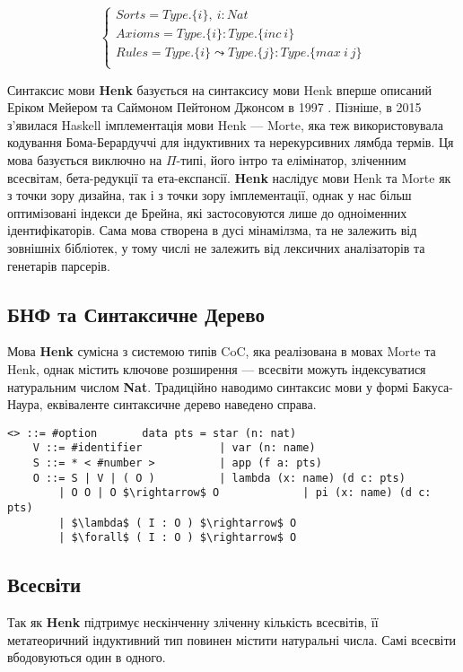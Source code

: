 \documentclass{article}
\begin{document}
$$
\begin{cases}
Sorts = Type.\{i\},\ i : Nat\\
Axioms = Type.\{i\} : Type.\{inc\ i\}\\
Rules = Type.\{i\} \leadsto Type.\{j\} : Type.\{max\ i\ j\}\\
\end{cases}
$$

Синтаксис мови \textbf{Henk} базується на синтаксису мови Henk вперше описаний Еріком Мейером та Саймоном Пейтоном Джонсом в 1997 \cite{Erik97}.
Пізніше, в 2015 з'явилася Haskell імплементація мови Henk — Morte, яка теж використовувала кодування Бома-Берардуччі для індуктивних та нерекурсивних лямбда термів.
Ця мова базується виключно на {\bf $\Pi$}-типі, його інтро та елімінатор, зліченним всесвітам, бета-редукції та ета-експансії.
\textbf{Henk} наслідує мови Henk та Morte як з точки зору дизайна, так і з точки зору імплементації, однак у нас більш оптимізовані індекси де Брейна,
які застосовуются лише до одноіменних ідентифікаторів. Сама мова створена в дусі мінамілзма, та не залежить від зовнішніх бібліотек,
у тому числі не залежить від лексичних аналізаторів та генетарів парсерів.

\subsection{БНФ та Синтаксичне Дерево}

Мова \textbf{Henk} сумісна з системою типів CoC, яка реалізована в мовах  Morte та Henk,
однак містить ключове розширення — всесвіти можуть індексуватися натуральним числом {\bf Nat}.
Традиційно наводимо синтаксис мови у формі Бакуса-Наура, еквіваленте синтаксичне дерево наведено справа.

\begin{lstlisting}[mathescape=true]
   <> ::= #option       data pts = star (n: nat)
    V ::= #identifier            | var (n: name)
    S ::= * < #number >          | app (f a: pts)
    O ::= S | V | ( O )          | lambda (x: name) (d c: pts)
        | O O | O $\rightarrow$ O             | pi (x: name) (d c: pts)
        | $\lambda$ ( I : O ) $\rightarrow$ O
        | $\forall$ ( I : O ) $\rightarrow$ O
\end{lstlisting}

\subsection{Всесвіти}

Так як \textbf{Henk} підтримує нескінченну зліченну кількість всесвітів, її метатеоричний
індуктивний тип повинен містити натуральні числа. Самі всесвіти вбодовуються один в одного.
\end{document}
